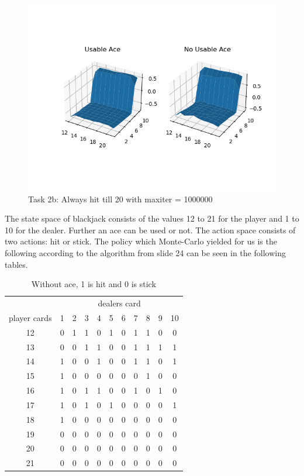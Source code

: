 \documentclass{article}
\begin{document}
\begin{figure}[H]
\centering
\includegraphics[width=\textwidth]{media/surface_plot.png}
\caption{Task 2b: Always hit till 20 with maxiter = 1000000}
\label{fig:}
\end{figure}
The state space of blackjack consists of the values 12 to 21 for the player and 1 to 10 for the dealer. Further an ace can be used or not. The action space consists of two actions: hit or stick. 
The policy which Monte-Carlo yielded for us is the following according to the algorithm from slide 24 can be seen in the following tables.



    \begin{table}[H]
    \centering
    \begin{tabular}{c|c|c|c|c|c|c|c|c|c|c}
        &\multicolumn{10}{c}{dealers card} \\
        player cards&1 & 2 & 3 & 4 & 5 & 6 & 7 & 8 & 9 & 10 \\
        \hline
        12 & 0 & 1 & 1 & 0 & 1 & 0 & 1 & 1 & 0 & 0 \\
        13 & 0 & 0 & 1 & 1 & 0 & 0 & 1 & 1 & 1 & 1 \\
        14 & 1 & 0 & 0 & 1 & 0 & 0 & 1 & 1 & 0 & 1 \\
        15 & 1 & 0 & 0 & 0 & 0 & 0 & 0 & 1 & 0 & 0 \\
        16 & 1 & 0 & 1 & 1 & 0 & 0 & 1 & 0 & 1 & 0 \\
        17 & 1 & 0 & 1 & 0 & 1 & 0 & 0 & 0 & 0 & 1 \\
        18 & 1 & 0 & 0 & 0 & 0 & 0 & 0 & 0 & 0 & 0 \\
        19 & 0 & 0 & 0 & 0 & 0 & 0 & 0 & 0 & 0 & 0 \\
        20 & 0 & 0 & 0 & 0 & 0 & 0 & 0 & 0 & 0 & 0 \\
        21 & 0 & 0 & 0 & 0 & 0 & 0 & 0 & 0 & 0 & 0 \\
    \end{tabular}
    \caption{Without ace, 1 is hit and 0 is stick}
    \label{tab:}
    \end{table}
    
\end{document}
